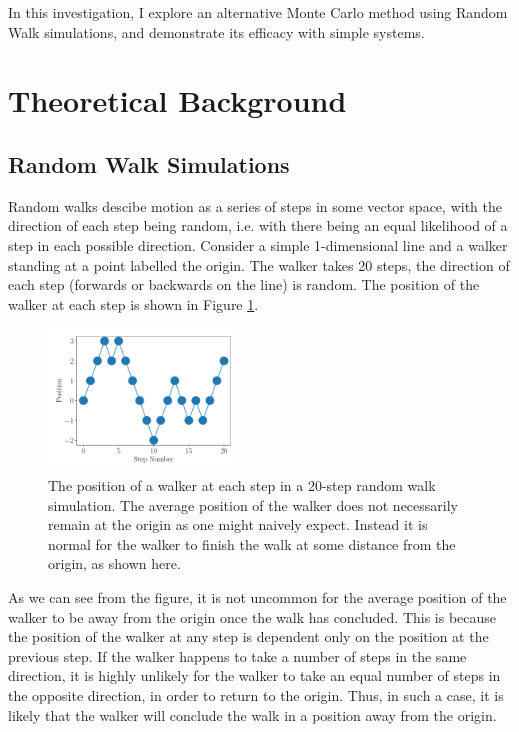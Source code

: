 \documentclass[journal]{IEEEtran}
\begin{document}
In this investigation, I explore an alternative Monte Carlo method using Random
Walk simulations, and demonstrate its efficacy with simple systems.


\section{Theoretical Background}
\label{sec:TheoreticalBackground}

\subsection{Random Walk Simulations}

Random walks descibe motion as a series of steps in some vector space, with the
direction of each step being random, i.e. with there being an equal likelihood
of a step in each possible direction. Consider a simple 1-dimensional line and a
walker standing at a point labelled the origin. The walker takes 20 steps, the
direction of each step (forwards or backwards on the line) is random. The
position of the walker at each step is shown in Figure \ref{fig:cartoon}.

\begin{figure}%
  \begin{center}
    \includegraphics[width=0.45\textwidth]{images/cartoon.pdf}
    \caption{The position of a walker at each step in a 20-step random walk
      simulation. The average position of the walker does not necessarily remain
      at the origin as one might naively expect. Instead it is normal for the
      walker to finish the walk at some distance from the origin, as shown here.}
    \label{fig:cartoon}
  \end{center}
\end{figure}

As we can see from the figure, it is not uncommon for the average position of
the walker to be away from the origin once the walk has concluded. This is
because the position of the walker at any step is dependent only on the position
at the previous step. If the walker happens to take a number of steps in the
same direction, it is highly unlikely for the walker to take an equal number of
steps in the opposite direction, in order to return to the origin. Thus, in such
a case, it is likely that the walker will conclude the walk in a position away
from the origin.
\end{document}
